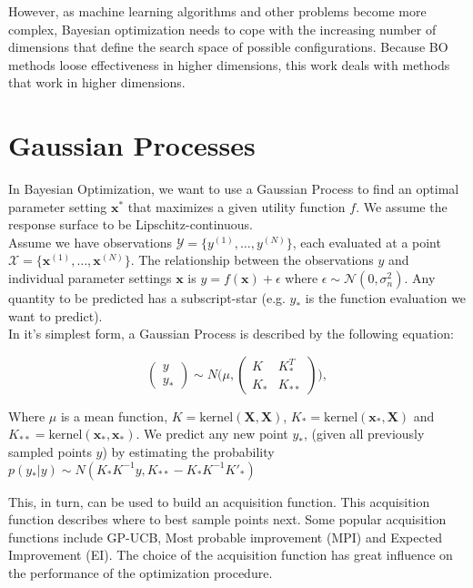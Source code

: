 However, as machine learning algorithms and other problems become more complex, Bayesian optimization needs to cope with the increasing number of dimensions that define the search space of possible configurations.
Because BO methods loose effectiveness in higher dimensions, this work deals with methods that work in higher dimensions.

\section{Gaussian Processes}
In Bayesian Optimization, we want to use a Gaussian Process to find an optimal parameter setting $\mathbf{x^*}$ that maximizes a given utility function $f$.
We assume the response surface to be Lipschitz-continuous. \\

Assume we have observations $ \mathcal{Y} = \{ y^{(1)}, \ldots, y^{(N)} \}$, each evaluated at a point $ \mathcal{X} = \{  \mathbf{x}^{(1)}, \ldots, \mathbf{x}^{(N)} \}$.
The relationship between the observations $y$ and individual parameter settings $\mathbf{x}$ is $y = f \left( \mathbf{x} \right) + \epsilon$ where $\epsilon \sim  \mathcal{N} \left( 0, \sigma^2_n \right)$. Any quantity to be predicted has a subscript-star (e.g. $y_*$ is the function evaluation we want to predict).\\

In it's simplest form, a Gaussian Process is described by the following equation:

\begin{equation}
\begin{pmatrix} y \\
y_* \end{pmatrix} \sim N\Biggl(\mu,\begin{pmatrix} K & K^T_*\\
 K_* & K_{**} \end{pmatrix}\Biggr),
\end{equation}

Where $\mu$ is a mean function, $K = \text{kernel}(\mathbf{X}, \mathbf{X})$, $K_* = \text{kernel}(\mathbf{x_*}, \mathbf{X})$ and $K_{**} = \text{kernel}(\mathbf{x_*}, \mathbf{x_*})$.
We predict any new point $y_*$, (given all previously sampled points $y$) by estimating the probability $ p(y_*|y) \sim N(K_*K^{-1}y,K_{**}-K_*K^{-1}K'_*) $

This, in turn, can be used to build an acquisition function. 
This acquisition function describes where to best sample points next.
Some popular acquisition functions include GP-UCB, Most probable improvement (MPI) and Expected Improvement (EI).
The choice of the acquisition function has great influence on the performance of the optimization procedure.\\

